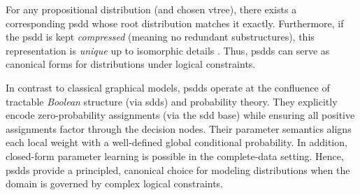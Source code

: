 For any propositional distribution (and chosen vtree), there exists a corresponding \acrshort{psdd} whose root distribution matches it exactly.  Furthermore, if the \acrshort{psdd} is kept \emph{compressed} (meaning no redundant substructures), this representation is \emph{unique} up to isomorphic details \cite{darwiche_knowledge_2002}.  Thus, \acrshort{psdd}s can serve as canonical forms for distributions under logical constraints.

In contrast to classical graphical models, \acrshort{psdd}s operate at the confluence of tractable \emph{Boolean} structure (via \acrshort{sdd}s) and probability theory.  They explicitly encode zero-probability assignments (via the \acrshort{sdd} base) while ensuring all positive assignments factor through the decision nodes.  Their parameter semantics aligns each local weight with a well-defined global conditional probability.  In addition, closed-form parameter learning is possible in the complete-data setting.  Hence, \acrshort{psdd}s provide a principled, canonical choice for modeling distributions when the domain is governed by complex logical constraints.